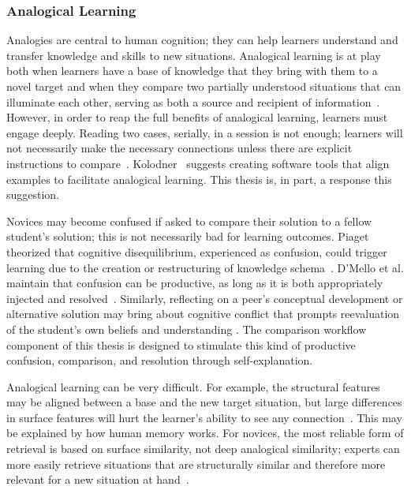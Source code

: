 \subsubsection{Analogical Learning}

Analogies are central to human cognition; they can help learners understand and transfer knowledge and skills to new situations. Analogical learning is at play both when learners have a base of knowledge that they bring with them to a novel target and when they compare two partially understood situations that can illuminate each other, serving as both a source and recipient of information~\cite{kurtz01learning,loewenstein2003analogical}. However, in order to reap the full benefits of analogical learning, learners must engage deeply. Reading two cases, serially, in a session is not enough; learners will not necessarily make the necessary connections unless there are explicit instructions to compare~\cite{loewenstein2003analogical,catrambone1989overcoming}. Kolodner~\cite{Kolodner} suggests creating software tools that align examples to facilitate analogical learning. This thesis is, in part, a response this suggestion.

Novices may become confused if asked to compare their solution to a fellow student's solution; this is not necessarily bad for learning outcomes. Piaget theorized that cognitive disequilibrium, experienced as confusion, could trigger learning due to the creation or restructuring of knowledge schema~\cite{disequilibrium}. D'Mello et al. maintain that confusion can be productive, as long as it is both appropriately injected and resolved~\cite{productiveconfusion}. Similarly, reflecting on a peer's conceptual development or alternative solution may bring about cognitive conflict that prompts reevaluation of the student's own beliefs and understanding \cite{kavanagh}. The comparison workflow component of this thesis is designed to stimulate this kind of productive confusion, comparison, and resolution through self-explanation. 

Analogical learning can be very difficult. For example, the structural features may be aligned between a base and the new target situation, but large differences in surface features will hurt the learner's ability to see any connection~\cite{Kurtz}. This may be explained by how human memory works. For novices, the most reliable form of retrieval is based on surface similarity, not deep analogical similarity; experts can more easily retrieve situations that are structurally similar and therefore more relevant for a new situation at hand~\cite{Loewenstein}.

